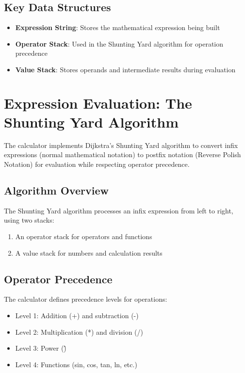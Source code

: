 \documentclass[12pt,a4paper]{article}
\begin{document}
\subsection{Key Data Structures}

\begin{itemize}
    \item \textbf{Expression String}: Stores the mathematical expression being built
    \item \textbf{Operator Stack}: Used in the Shunting Yard algorithm for operation precedence
    \item \textbf{Value Stack}: Stores operands and intermediate results during evaluation
\end{itemize}

\section{Expression Evaluation: The Shunting Yard Algorithm}

The calculator implements Dijkstra's Shunting Yard algorithm to convert infix expressions (normal mathematical notation) to postfix notation (Reverse Polish Notation) for evaluation while respecting operator precedence.

\subsection{Algorithm Overview}

The Shunting Yard algorithm processes an infix expression from left to right, using two stacks:
\begin{enumerate}
    \item An operator stack for operators and functions
    \item A value stack for numbers and calculation results
\end{enumerate}

\subsection{Operator Precedence}

The calculator defines precedence levels for operations:
\begin{itemize}
    \item Level 1: Addition (+) and subtraction (-)
    \item Level 2: Multiplication (*) and division (/)
    \item Level 3: Power (\^)
    \item Level 4: Functions (sin, cos, tan, ln, etc.)
\end{itemize}
\end{document}
